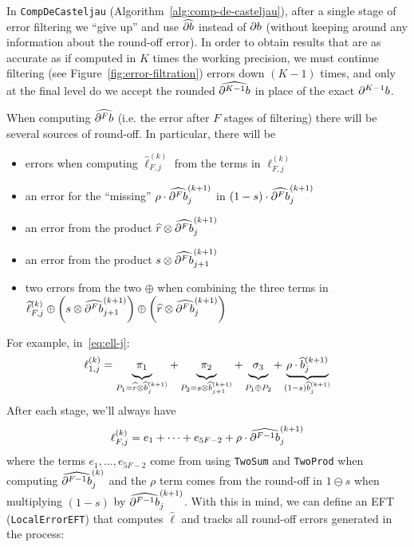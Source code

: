 In \texttt{CompDeCasteljau} (Algorithm~\ref{alg:comp-de-casteljau}), after
a single stage of error filtering we
``give up'' and use \(\cdb{1}\) instead of
\(\db{1}\) (without keeping around any information about the
round-off error). In order to obtain results that are as accurate as if
computed in \(K\) times the working precision, we must continue filtering
(see Figure~\ref{fig:error-filtration})
errors down \((K - 1)\) times, and only at the final level do we accept
the rounded
\(\cdb{K - 1}\) in place of the exact
\(\db{K - 1}\).

When computing \(\cdb{F}\) (i.e. the error after
\(F\) stages of filtering)
there will be several sources of round-off. In particular, there will be
\begin{itemize}
\itemsep 0em
\item errors when computing \(\widehat{\ell}_{F, j}^{(k)}\) from the
  terms in \(\ell_{F, j}^{(k)}\)
\item an error
for the ``missing'' \(\rho \cdot \cdb{F}_j^{(k + 1)}\) in
\((1 - s) \cdot \cdb{F}_j^{(k + 1)}\)
\item an error from the product
  \(\widehat{r} \otimes \cdb{F}_j^{(k + 1)}\)
\item an error from the product
  \(s \otimes \cdb{F}_{j + 1}^{(k + 1)}\)
\item two errors from the two \(\oplus\) when combining the three
  terms in
  \(\widehat{\ell}_{F, j}^{(k)} \oplus
  \left(s \otimes \cdb{F}_{j + 1}^{(k + 1)}\right) \oplus
  \left(\widehat{r} \otimes \cdb{F}_j^{(k + 1)}\right)\)
\end{itemize}
For example, in~\eqref{eq:ell-j}:
\begin{equation}
\ell_{1, j}^{(k)} =
    \underbrace{\vphantom{\rho \cdot \widehat{b}_j^{(k + 1)}} \pi_1}_{
        \vphantom{(1 - s) \widehat{b}_j^{(k + 1)}}
        P_1 = \widehat{r} \otimes \widehat{b}_j^{(k + 1)}} +
    \underbrace{\vphantom{\rho \cdot \widehat{b}_j^{(k + 1)}} \pi_2}_{
        \vphantom{(1 - s) \widehat{b}_j^{(k + 1)}}
        P_2 = s \otimes \widehat{b}_{j + 1}^{(k + 1)}} +
    \underbrace{\vphantom{\rho \cdot \widehat{b}_j^{(k + 1)}} \sigma_3}_{
        \vphantom{(1 - s) \widehat{b}_j^{(k + 1)}}
        P_1 \oplus P_2} +
    \underbrace{\rho \cdot \widehat{b}_j^{(k + 1)}}_{
        (1 - s) \widehat{b}_j^{(k + 1)}}
\end{equation}
After each stage, we'll always have
\begin{equation}
\ell_{F, j}^{(k)} = e_1 + \cdots + e_{5F - 2} + \rho \cdot
\cdb{F - 1}_j^{(k + 1)}
\end{equation}
where the terms \(e_1, \ldots, e_{5F - 2}\) come from using \texttt{TwoSum}
and \texttt{TwoProd} when computing \(\cdb{F - 1}_j^{(k)}\)
and the \(\rho\) term comes from the round-off
in \(1 \ominus s\) when multiplying \((1 - s)\) by
\(\cdb{F - 1}_j^{(k + 1)}\). With this in mind, we
can define an EFT (\texttt{LocalErrorEFT}) that computes
\(\widehat{\ell}\) and tracks all round-off errors generated in
the process:

